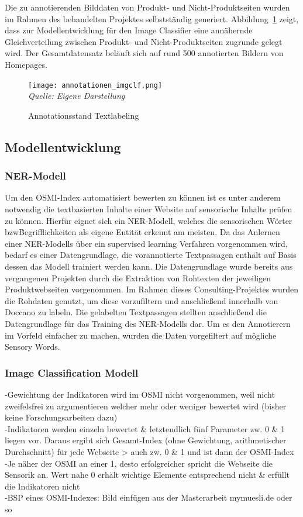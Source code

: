 Die zu annotierenden Bilddaten von Produkt- und Nicht-Produktseiten wurden im Rahmen des behandelten Projektes selbstständig generiert.
Abbildung~\ref{fig:annotation_imgclf} zeigt, dass zur Modellentwicklung für den Image Classifier eine annähernde Gleichverteilung zwischen Produkt-
und Nicht-Produktseiten zugrunde gelegt wird.
Der Gesamtdatensatz beläuft sich auf rund 500 annotierten Bildern von Homepages.
\begin{figure}[H]
	\caption{Annotationsstand Textlabeling}\label{fig:annotation_imgclf}
	\texttt{[image: annotationen\_imgclf.png]}
	\\
	\textit{Quelle: Eigene Darstellung}
\end{figure}


\subsection{Modellentwicklung}

\subsubsection{NER-Modell}
Um den \ac{OSMI}-Index automatisiert bewerten zu können ist es unter anderem notwendig die textbasierten Inhalte einer
Website auf sensorische Inhalte prüfen zu können.
Hierfür eignet sich ein \ac{NER}-Modell, welches die sensorischen Wörter bzw\. Begrifflichkeiten als eigene Entität erkennt
am meisten.
Da das Anlernen einer NER-Modells über ein supervised learning Verfahren vorgenommen wird, bedarf es einer Datengrundlage,
die vorannotierte Textpassagen enthält auf Basis dessen das Modell trainiert werden kann.
Die Datengrundlage wurde bereits aus vergangenen Projekten durch die Extraktion von Rohtexten der jeweiligen Produktwebseiten
vorgenommen.
Im Rahmen dieses Consulting-Projektes wurden die Rohdaten genutzt, um diese vorzufiltern und anschließend innerhalb von
Doccano zu labeln.
Die gelabelten Textpassagen stellten anschließend die Datengrundlage für das Training des \ac{NER}-Modells dar.
Um es den Annotierern im Vorfeld einfacher zu machen, wurden die Daten vorgefiltert auf mögliche Sensory Words.

\subsubsection{Image Classification Modell}

-Gewichtung der Indikatoren wird im \ac{OSMI} nicht vorgenommen, weil nicht zweifelsfrei zu
argumentieren welcher mehr oder weniger bewertet wird (bisher keine Forschungsarbeiten
dazu) \\
-Indikatoren werden einzeln bewertet \& letztendlich fünf Parameter zw. 0 \& 1 liegen vor.
Daraus ergibt sich Gesamt-Index (ohne Gewichtung, arithmetischer Durchschnitt) für jede
Webseite > auch zw. 0 \& 1 und ist dann der \ac{OSMI}-Index \\
-Je näher der \ac{OSMI} an einer 1, desto erfolgreicher spricht die Webseite die Sensorik an. Wert
nahe 0 erhält wichtige Elemente entsprechend nicht \& erfüllt die Indikatoren nicht \\
-BSP eines \ac{OSMI}-Indexes: Bild einfügen aus der Masterarbeit mymuesli.de oder so



